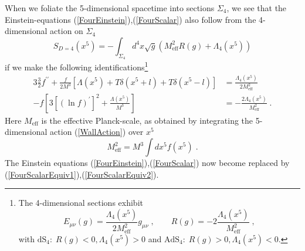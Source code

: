 \documentclass[a4paper,12pt]{article}
\begin{document}
When we foliate
the 5-dimensional spacetime into sections $\Sigma_4$, we see that the
Einstein-equations (\ref{FourEinstein}),(\ref{FourScalar}) also follow from
the 4-dimensional action on $\Sigma_4$
\begin{equation}
   S_{D=4}(x^5) =-\int_{\Sigma_4} d^4x \sqrt{g}\left( M^2_{\text{eff}} R(g)
                                          +\Lambda_4(x^5) 
                                    \right)
\end{equation} 
if we make the following identifications\footnote{The 4-dimensional sections
  exhibit
                 \begin{equation*}
                    E_{\mu\nu}(g) = \frac{\Lambda_4(x^5)}{2M_{\text{eff}}^2}
                                    g_{\mu\nu} \; , \qquad
                    R(g) = -2\frac{\Lambda_4(x^5)}{M_{\text{eff}}^2} \; , 
                 \end{equation*}
  with $\text{dS}_4:\; R(g)<0,\Lambda_4(x^5)>0$ and $\text{AdS}_4:\;
  R(g)>0,\Lambda_4(x^5)<0$.}
\begin{alignat}{3}
    \frac{3}{2}f^{\prime\prime}+\frac{f}{2M^3}
    \left[ \Lambda(x^5)+T\delta(x^5+l)+T\delta(x^5-l) \right]
 &= \frac{\Lambda_4(x^5)}{2M_{\text{eff}}^2} 
     \label{FourScalarEquiv1} \\
    -f\left[3\left[(\ln f)^\prime\right]^2+\frac{\Lambda(x^5)}{M^3}
      \right]
 &= -\frac{2\Lambda_4(x^5)}{M_{\text{eff}}^2} \; .
     \label{FourScalarEquiv2} 
\end{alignat}
Here $M_{\text{eff}}$ is the effective Planck-scale, as obtained by
integrating the 5-dimensional action (\ref{WallAction}) over $x^5$
\begin{equation}
  M_{\text{eff}}^2 = M^3 \int dx^5 f(x^5) \; .
\end{equation}
The Einstein equations (\ref{FourEinstein}),(\ref{FourScalar}) now become
replaced by (\ref{FourScalarEquiv1}),(\ref{FourScalarEquiv2}).
\end{document}
